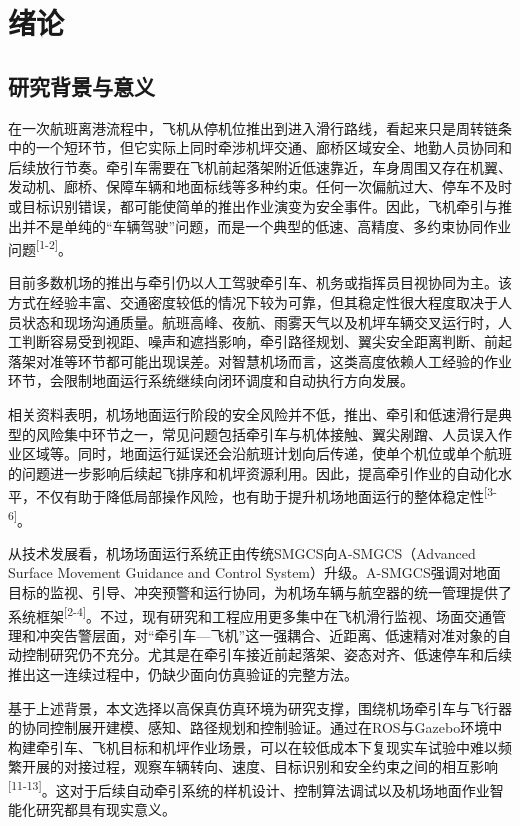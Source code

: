 
\chapter{绪论}

\section{研究背景与意义}

在一次航班离港流程中，飞机从停机位推出到进入滑行路线，看起来只是周转链条中的一个短环节，但它实际上同时牵涉机坪交通、廊桥区域安全、地勤人员协同和后续放行节奏。牵引车需要在飞机前起落架附近低速靠近，车身周围又存在机翼、发动机、廊桥、保障车辆和地面标线等多种约束。任何一次偏航过大、停车不及时或目标识别错误，都可能使简单的推出作业演变为安全事件。因此，飞机牵引与推出并不是单纯的“车辆驾驶”问题，而是一个典型的低速、高精度、多约束协同作业问题\textsuperscript{[1-2]}。

目前多数机场的推出与牵引仍以人工驾驶牵引车、机务或指挥员目视协同为主。该方式在经验丰富、交通密度较低的情况下较为可靠，但其稳定性很大程度取决于人员状态和现场沟通质量。航班高峰、夜航、雨雾天气以及机坪车辆交叉运行时，人工判断容易受到视距、噪声和遮挡影响，牵引路径规划、翼尖安全距离判断、前起落架对准等环节都可能出现误差。对智慧机场而言，这类高度依赖人工经验的作业环节，会限制地面运行系统继续向闭环调度和自动执行方向发展。

相关资料表明，机场地面运行阶段的安全风险并不低，推出、牵引和低速滑行是典型的风险集中环节之一，常见问题包括牵引车与机体接触、翼尖剐蹭、人员误入作业区域等。同时，地面运行延误还会沿航班计划向后传递，使单个机位或单个航班的问题进一步影响后续起飞排序和机坪资源利用。因此，提高牵引作业的自动化水平，不仅有助于降低局部操作风险，也有助于提升机场地面运行的整体稳定性\textsuperscript{[3-6]}。

从技术发展看，机场场面运行系统正由传统SMGCS向A-SMGCS（Advanced Surface
Movement Guidance and Control
System）升级。A-SMGCS强调对地面目标的监视、引导、冲突预警和运行协同，为机场车辆与航空器的统一管理提供了系统框架\textsuperscript{[2-4]}。不过，现有研究和工程应用更多集中在飞机滑行监视、场面交通管理和冲突告警层面，对“牵引车---飞机”这一强耦合、近距离、低速精对准对象的自动控制研究仍不充分。尤其是在牵引车接近前起落架、姿态对齐、低速停车和后续推出这一连续过程中，仍缺少面向仿真验证的完整方法。

基于上述背景，本文选择以高保真仿真环境为研究支撑，围绕机场牵引车与飞行器的协同控制展开建模、感知、路径规划和控制验证。通过在ROS与Gazebo环境中构建牵引车、飞机目标和机坪作业场景，可以在较低成本下复现实车试验中难以频繁开展的对接过程，观察车辆转向、速度、目标识别和安全约束之间的相互影响\textsuperscript{[11-13]}。这对于后续自动牵引系统的样机设计、控制算法调试以及机场地面作业智能化研究都具有现实意义。

